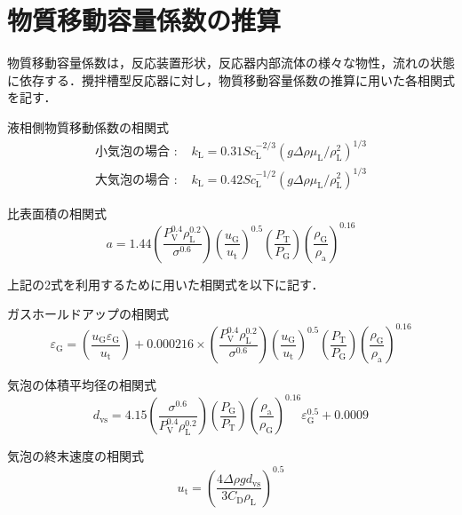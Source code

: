 \documentclass[a4j]{jsreport}
\begin{document}
\section{物質移動容量係数の推算}
物質移動容量係数は，反応装置形状，反応器内部流体の様々な物性，流れの状態に依存する．攪拌槽型反応器に対し，物質移動容量係数の推算に用いた各相関式を記す．

\noindent 液相側物質移動係数の相関式\cite{化工便覧}
\begin{align}
  \text{小気泡の場合 : }　&k_\mathrm{L} = 0.31Sc_\mathrm{L}^{-2/3}(g \varDelta \rho \mu_\mathrm{L}/\rho_\mathrm{L}^2)^{1/3} \\
  \text{大気泡の場合 : }　&k_\mathrm{L} = 0.42Sc_\mathrm{L}^{-1/2}(g \varDelta \rho \mu_\mathrm{L}/\rho_\mathrm{L}^2)^{1/3}
\end{align}

\noindent 比表面積の相関式\cite{化工便覧}
\begin{equation}
    a = 1.44 \left( \frac{P_\mathrm{V}^{0.4} \rho_\mathrm{L}^{0.2} }{ \sigma^{0.6}} \right) \left( \frac{u_\mathrm{G}}{u_\mathrm{t}} \right)^{0.5} \left( \frac{P_\mathrm{T}}{P_\mathrm{G}} \right) \left( \frac{\rho_\mathrm{G}}{\rho_\mathrm{a}} \right)^{0.16}
\end{equation}

上記の2式を利用するために用いた相関式を以下に記す．

\noindent ガスホールドアップの相関式\cite{化工便覧}
\begin{equation}
    \varepsilon_{{\mathrm G}} = \left( \frac{u_{{\mathrm G}}\varepsilon_{{\mathrm G}}}{u_{{\mathrm t}}} \right) + 0.000216 \times \left( \frac{P_\mathrm{V}^{0.4} \rho_\mathrm{L}^{0.2} }{ \sigma^{0.6}} \right) \left( \frac{u_\mathrm{G}}{u_\mathrm{t}} \right)^{0.5} \left( \frac{P_\mathrm{T}}{P_\mathrm{G}} \right) \left( \frac{\rho_\mathrm{G}}{\rho_\mathrm{a}} \right)^{0.16}
\end{equation}

\noindent 気泡の体積平均径の相関式\cite{化工便覧}
\begin{equation}
    d_\mathrm{vs} = 4.15 \left( \frac{\sigma^{0.6}}{P_\mathrm{V}^{0.4} \rho_\mathrm{L}^{0.2}} \right) \left( \frac{P_\mathrm{G}}{P_\mathrm{T}} \right) \left( \frac{\rho_\mathrm{a}}{\rho_\mathrm{G}} \right) ^{0.16} \varepsilon_\mathrm{G}^{0.5} + 0.0009
\end{equation}

\noindent 気泡の終末速度の相関式\cite{化工便覧}
\begin{equation}
    u_\mathrm{t} = \left( \frac{4\varDelta \rho g d_\mathrm{vs}}{3C_\mathrm{D} \rho_\mathrm{L}} \right)^{0.5}
\end{equation}
\end{document}
